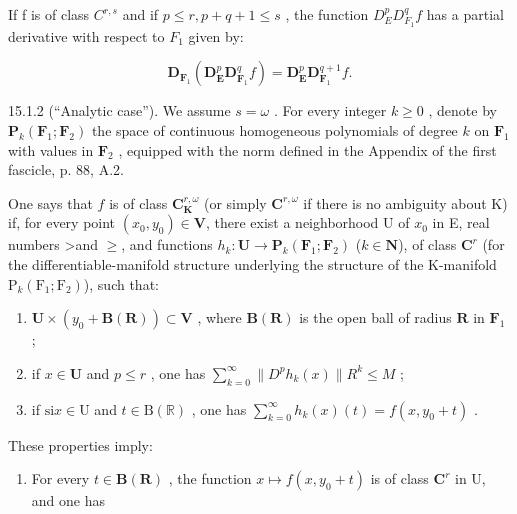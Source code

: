 If f is of class \(C^{r,s}\) and if \(p \leqslant r, p + q + 1 \leqslant s\) , the function \(D_{E}^{p}D_{F_{1}}^{q}f\) has a partial derivative with respect to \(F_{1}\) given by:

\[
\mathbf {D} _ {\mathbf {F} _ {1}} (\mathbf {D} _ {\mathbf {E}} ^ {p} \mathbf {D} _ {\mathbf {F} _ {1}} ^ {q} f) = \mathbf {D} _ {\mathbf {E}} ^ {p} \mathbf {D} _ {\mathbf {F} _ {1}} ^ {q + 1} f.\tag{1}
\]

15.1.2 (“Analytic case”). We assume \(s = \omega\) . For every integer \(k \geqslant 0\) , denote by \(\mathbf{P}_{k}(\mathbf{F}_{1}; \mathbf{F}_{2})\) the space of continuous homogeneous polynomials of degree \(k\) on \(\mathbf{F}_{1}\) with values in \(\mathbf{F}_{2}\) , equipped with the norm defined in the Appendix of the first fascicle, p. 88, A.2.

One says that \(f\) is of class \(\mathbf{C}_{\mathbf{K}}^{r,\omega}\) (or simply \(\mathbf{C}^{r,\omega}\) if there is no ambiguity about K) if, for every point \((x_{0},y_{0})\in\mathbf{V}\), there exist a neighborhood U of \(x_{0}\) in E, real numbers \textgreater and \(\geqslant\), and functions \(h_{k}\colon\mathbf{U}\to\mathbf{P}_{k}(\mathbf{F}_{1};\mathbf{F}_{2})\) (\(k\in\mathbf{N}\)), of class \(\mathbf{C}^{r}\) (for the differentiable-manifold structure underlying the structure of the K-manifold \(\mathrm{P}_{k}(\mathrm{F}_{1};\mathrm{F}_{2})\)), such that:

\begin{enumerate}
\def\labelenumi{(\roman{enumi})}
\item
  \(\mathbf{U} \times (y_0 + \mathbf{B}(\mathbf{R})) \subset \mathbf{V}\) , where \(\mathbf{B}(\mathbf{R})\) is the open ball of radius \(\mathbf{R}\) in \(\mathbf{F}_1\) ;
\item
  if \(x \in \mathbf{U}\) and \(p \leqslant r\) , one has \(\sum_{k=0}^{\infty} \| D^p h_k(x) \| R^k \leqslant M\) ;
\item
  if \(\mathrm{si} x \in \mathrm{U}\) and \(t \in \mathrm{B}(\mathbb{R})\) , one has \(\sum_{k=0}^{\infty} h_k(x)(t) = f(x, y_0 + t)\) .
\end{enumerate}

These properties imply:

\begin{enumerate}
\def\labelenumi{(\roman{enumi})}
\setcounter{enumi}{3}
\tightlist
\item
  For every \(t \in \mathbf{B}(\mathbf{R})\) , the function \(x \mapsto f(x, y_0 + t)\) is of class \(\mathbf{C}^{r}\) in U, and one has
\end{enumerate}

